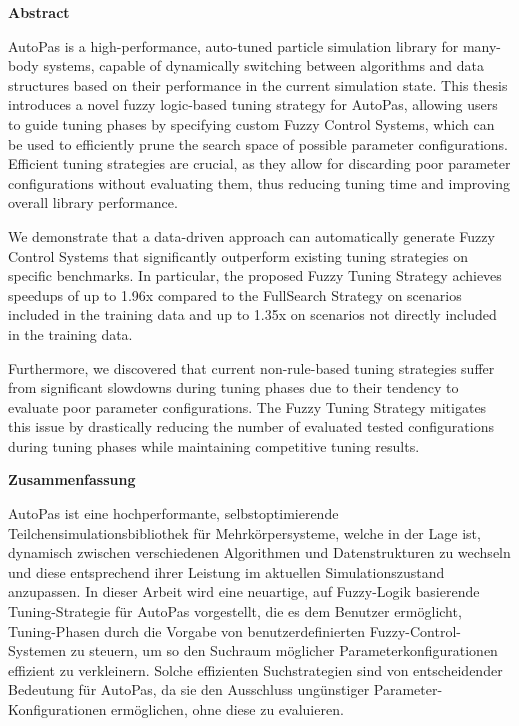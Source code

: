 {}
\vspace*{2cm}
\begin{center}
    {\Large \textbf{Abstract}}
\end{center}
\vspace{1cm}

AutoPas is a high-performance, auto-tuned particle simulation library for many-body systems, capable of dynamically switching between algorithms and data structures based on their performance in the current simulation state.
This thesis introduces a novel fuzzy logic-based tuning strategy for AutoPas, allowing users to guide tuning phases by specifying custom Fuzzy Control Systems, which can be used to efficiently prune the search space of possible parameter configurations. Efficient tuning strategies are crucial, as they allow for discarding poor parameter configurations without evaluating them, thus reducing tuning time and improving overall library performance.

We demonstrate that a data-driven approach can automatically generate Fuzzy Control Systems that significantly outperform existing tuning strategies on specific benchmarks. In particular, the proposed Fuzzy Tuning Strategy achieves speedups of up to 1.96x compared to the FullSearch Strategy on scenarios included in the training data and up to 1.35x on scenarios not directly included in the training data.

Furthermore, we discovered that current non-rule-based tuning strategies suffer from significant slowdowns during tuning phases due to their tendency to evaluate poor parameter configurations. The Fuzzy Tuning Strategy mitigates this issue by drastically reducing the number of evaluated tested configurations during tuning phases while maintaining competitive tuning results.

\cleardoublepage

{}
\vspace*{2cm}
\begin{center}
    {\Large \textbf{Zusammenfassung}}
\end{center}
\vspace{1cm}

AutoPas ist eine hochperformante, selbstoptimierende Teilchensimulationsbibliothek für Mehrkörpersysteme, welche in der Lage ist, dynamisch zwischen verschiedenen Algorithmen und Datenstrukturen zu wechseln und diese entsprechend ihrer Leistung im aktuellen Simulationszustand anzupassen.
In dieser Arbeit wird eine neuartige, auf Fuzzy-Logik basierende Tuning-Strategie für AutoPas vorgestellt, die es dem Benutzer ermöglicht, Tuning-Phasen durch die Vorgabe von benutzerdefinierten Fuzzy-Control-Systemen zu steuern, um so den Suchraum möglicher Parameterkonfigurationen effizient zu verkleinern. Solche effizienten Suchstrategien sind von entscheidender Bedeutung für AutoPas, da sie den Ausschluss ungünstiger Parameter-Konfigurationen ermöglichen, ohne diese zu evaluieren.

